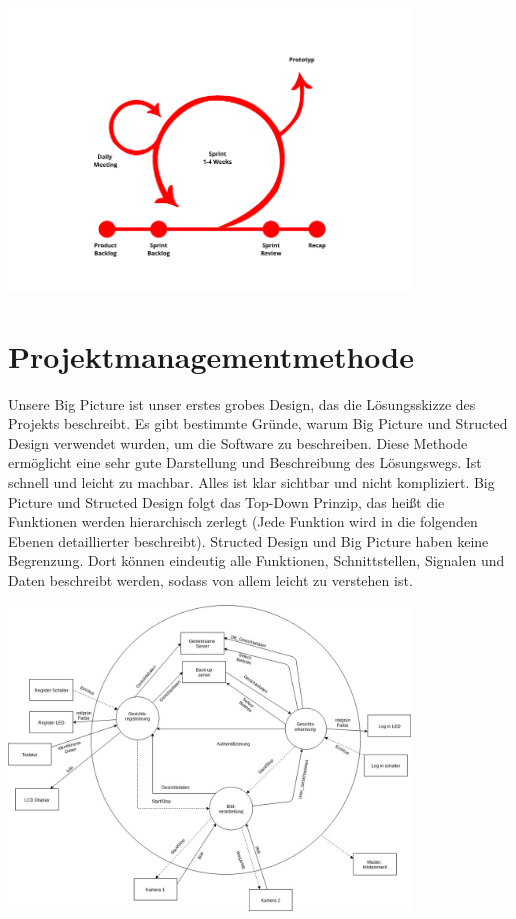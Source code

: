 \includegraphics[width=0.8\textwidth]{./figures/scrum.jpg}

\section{Projektmanagementmethode}


Unsere Big Picture ist unser erstes grobes Design, das die Lösungsskizze des Projekts beschreibt. Es gibt bestimmte Gründe, warum Big Picture und Structed Design verwendet wurden, um die Software zu beschreiben. Diese Methode ermöglicht eine sehr gute Darstellung und Beschreibung des Lösungswegs. Ist schnell und leicht zu machbar. Alles ist klar sichtbar und nicht kompliziert. Big Picture und Structed Design folgt das Top-Down Prinzip, das heißt die Funktionen werden hierarchisch zerlegt (Jede Funktion wird in die folgenden Ebenen detaillierter beschreibt). Structed Design und Big Picture haben keine Begrenzung. Dort können eindeutig alle Funktionen, Schnittstellen, Signalen und Daten beschreibt werden, sodass von allem leicht zu verstehen ist. 

\includegraphics[width=0.8\textwidth]{./figures/Big_Picture.jpg}

